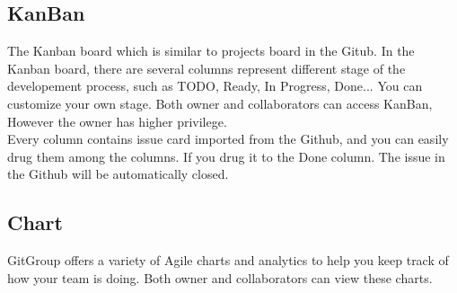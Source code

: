 \documentclass[12pt,a4paper]{report}
\begin{document}
\subsection{KanBan}
The Kanban board which is similar to projects board in the Gitub. In the Kanban board, there are several columns represent different stage of the developement process, such as TODO, Ready, In Progress, Done... You can customize your own stage. Both owner and collaborators can access KanBan, However the owner has higher privilege.\\
Every column contains issue card imported from the Github, and you can easily drug them among the columns. If you drug it to the Done column. The issue in the Github will be automatically closed.\cite{zube}
\subsection{Chart}
GitGroup offers a variety of Agile charts and analytics to help you keep track of how your team is doing. Both owner and collaborators can view these charts.\cite{zube}
\end{document}
